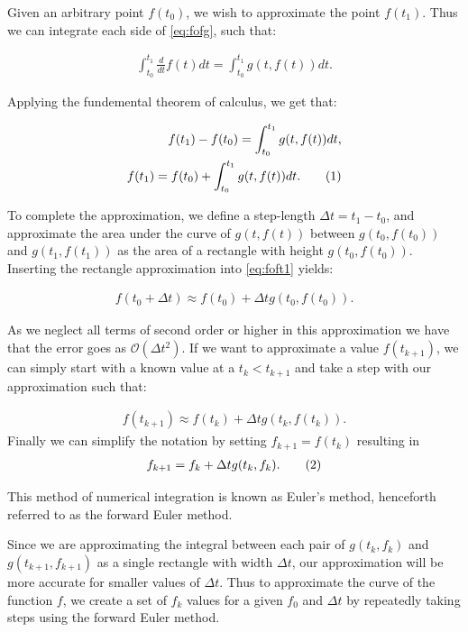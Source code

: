 \documentclass[reprint,english,notitlepage]{revtex4-1}  %
\newcommand\numberthis{\addtocounter{equation}{1}\tag{\theequation}}
\begin{document}
Given an arbitrary point \(f(t_{0})\), we wish to approximate the point \(f(t_{1})\). Thus we can integrate each side of \eqref{eq:fofg}, such that:

\begin{align*}
	\int_{t_{0}}^{t_{1}} \frac{d}{dt} f(t) dt = \int_{t_{0}}^{t_{1}} g(t, f(t)) dt.
\end{align*}

Applying the fundemental theorem of calculus, we get that:

\begin{align*}
	f(t_{1}) - f(t_{0}) = \int_{t_{0}}^{t_{1}} g(t, f(t)) dt, \\
	f(t_{1}) = f(t_{0}) + \int_{t_{0}}^{t_{1}} g(t, f(t)) dt. \numberthis \label{eq:foft1}
\end{align*}

To complete the approximation, we define a step-length \(\Delta t = t_{1}-t_{0}\), and approximate the area under the curve of \(g(t, f(t))\) between \(g(t_{0}, f(t_{0}))\) and \(g(t_{1}, f(t_{1}))\) as the area of a rectangle with height \(g(t_{0}, f(t_{0}))\). Inserting the rectangle approximation into \eqref{eq:foft1} yields:

\begin{align*}
	f(t_{0} + \Delta t) \approx f(t_{0}) + \Delta t g(t_{0}, f(t_{0})).
\end{align*}

As we neglect all terms of second order or higher in this approximation we have that the error goes as $\mathcal{O}(\Delta t^2)$.
If we want to approximate a value \(f(t_{k+1})\), we can simply start with a known value at a \(t_{k} < t_{k+1}\) and take a step with our approximation such that:

\begin{align*}
	f(t_{k+1}) \approx f(t_{k}) + \Delta t g(t_{k}, f(t_{k})).
\end{align*}
Finally we can simplify the notation by setting \(f_{k+1} = f(t_{k})\) resulting in
\begin{align*}
	f_{k+1} = f_{k} + \Delta t g(t_{k}, f_{k}). \numberthis \label{eq:forwardEuler}
\end{align*}

This method of numerical integration is known as Euler's method, henceforth referred to as the forward Euler method.

Since we are approximating the integral between each pair of \(g(t_k, f_{k})\) and \(g(t_{k+1}, f_{k+1})\)  as a single rectangle with width \(\Delta t\), our approximation will be more accurate for smaller values of \(\Delta t\). Thus to approximate the curve of the function \(f\), we create a set of \(f_{k}\) values for a given \(f_{0}\) and \(\Delta t\) by repeatedly taking steps using the forward Euler method.
\end{document}
